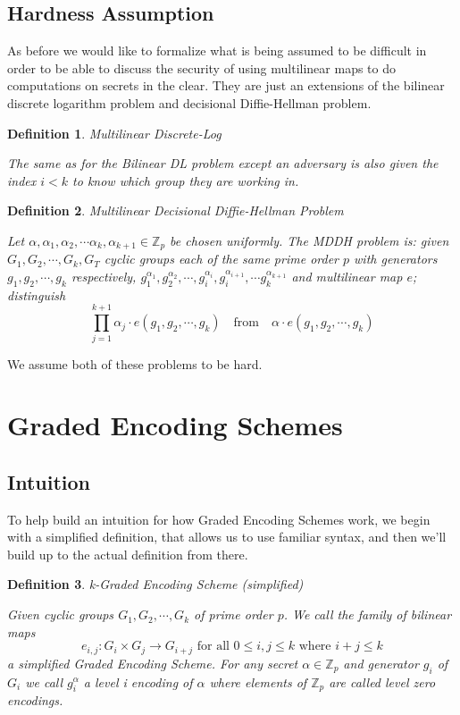 \documentclass[12pt,twoside]{reedthesis}
\newtheorem{definition}{Definition}
\newcommand{\Z}[0]{\mathbb{Z}}
\begin{document}
 \subsection{Hardness Assumption}
 
 As before we would like to formalize what is being assumed to be difficult in order to be able to discuss the security of using multilinear maps to do computations on secrets in the clear. They are just an extensions of the bilinear discrete logarithm problem and decisional Diffie-Hellman problem.
 
 \begin{definition}{Multilinear Discrete-Log} \par
 The same as for the Bilinear DL problem except an adversary is also given the index $i<k$ to know which group they are working in.
 \end{definition}
 
 
 \begin{definition}{Multilinear Decisional Diffie-Hellman Problem} 
\par Let $\alpha,\alpha_1,\alpha_2,\cdots \alpha_k, \alpha_{k+1} \in \Z_p$ be chosen uniformly. The MDDH problem is: given $G_1,G_2, \cdots, G_k,G_T$ cyclic groups each of the same prime order $p$ with generators $g_1,g_2,\cdots, g_k$ respectively, $g_1^{\alpha_1}, g_2^{\alpha_2}, \cdots, g_i^{\alpha_i} , g_i^{\alpha_{i+1}},\cdots g_k^{\alpha_{k+1}}$ and multilinear map $e$; distinguish 
$$\prod_{j=1}^{k+1}\alpha_j \cdot e(g_1,g_2,\cdots,g_k)  \quad \text{from} \quad \alpha \cdot e(g_1,g_2,\cdots ,g_k)$$
 \end{definition}    
  

\par We assume both of these problems to be hard.

            
    
    \section{Graded Encoding Schemes}
    
      
    \subsection{Intuition}
    To help build an intuition for how Graded Encoding Schemes work, we begin with a simplified definition, that allows us to use familiar syntax, and then we'll build up to the actual definition from there.    
    
    \begin{definition}{k-Graded Encoding Scheme (simplified)} 
    \par Given cyclic groups $G_1,G_2, \cdots , G_k$ of prime order $p$. We call the family of bilinear maps $$e_{i,j}:G_i \times G_j \rightarrow G_{i+j} \text{ for all } 0 \leq i,j \leq k \text{ where } i+j \leq k$$
    a simplified Graded Encoding Scheme. For any secret $\alpha \in \Z_p$ and generator $g_i$ of $G_i$ we call $g_i^\alpha$ a level i encoding of $\alpha$ where elements of $\Z_p$ are called level zero encodings. 
    \end{definition}
    
\end{document}
